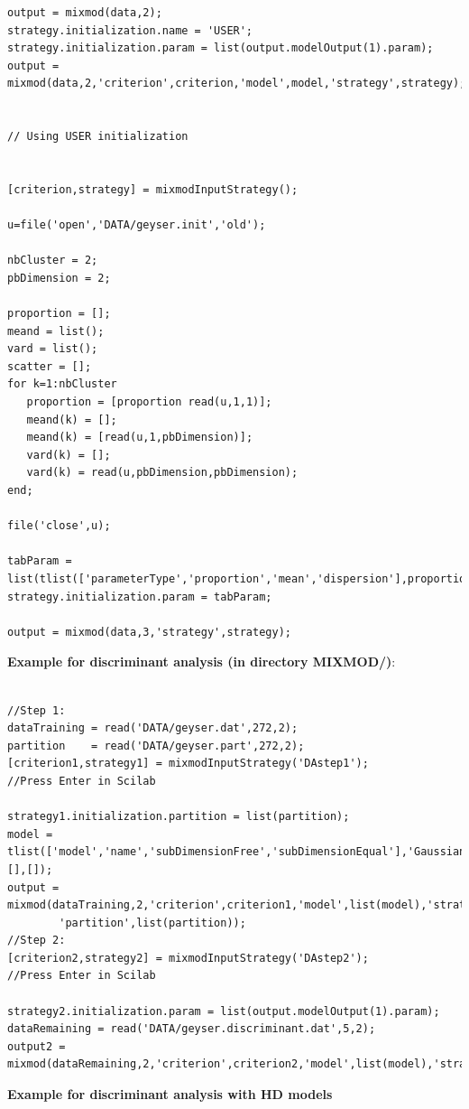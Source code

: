 \begin{itemize}
{\begin{verbatim}
output = mixmod(data,2);
strategy.initialization.name = 'USER';
strategy.initialization.param = list(output.modelOutput(1).param);
output = mixmod(data,2,'criterion',criterion,'model',model,'strategy',strategy);


// Using USER initialization


[criterion,strategy] = mixmodInputStrategy();

u=file('open','DATA/geyser.init','old');

nbCluster = 2;
pbDimension = 2;

proportion = [];
meand = list();
vard = list();
scatter = [];
for k=1:nbCluster
   proportion = [proportion read(u,1,1)];
   meand(k) = [];
   meand(k) = [read(u,1,pbDimension)];
   vard(k) = [];
   vard(k) = read(u,pbDimension,pbDimension);
end;

file('close',u);

tabParam = list(tlist(['parameterType','proportion','mean','dispersion'],proportion,meand,vard));
strategy.initialization.param = tabParam;

output = mixmod(data,3,'strategy',strategy);
\end{verbatim}

{\normalsize \textbf{Example for discriminant analysis (in directory MIXMOD/)}:}

\begin{verbatim}

//Step 1:
dataTraining = read('DATA/geyser.dat',272,2);
partition    = read('DATA/geyser.part',272,2);
[criterion1,strategy1] = mixmodInputStrategy('DAstep1');
//Press Enter in Scilab

strategy1.initialization.partition = list(partition);
model = tlist(['model','name','subDimensionFree','subDimensionEqual'],'Gaussian_p_L_I',[],[]);
output = mixmod(dataTraining,2,'criterion',criterion1,'model',list(model),'strategy',strategy1,
        'partition',list(partition));
//Step 2:
[criterion2,strategy2] = mixmodInputStrategy('DAstep2');
//Press Enter in Scilab

strategy2.initialization.param = list(output.modelOutput(1).param);
dataRemaining = read('DATA/geyser.discriminant.dat',5,2);
output2 = mixmod(dataRemaining,2,'criterion',criterion2,'model',list(model),'strategy',strategy2);
\end{verbatim}

{\normalsize \textbf{Example for discriminant analysis with HD models} }

\begin{verbatim}


\end{verbatim}}
\end{itemize}
